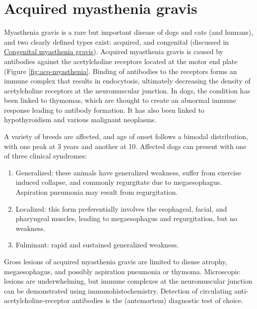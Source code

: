\documentclass[openany]{book}
\providecommand{\tightlist}{%
  \setlength{\itemsep}{0pt}\setlength{\parskip}{0pt}}
\begin{document}
\hypertarget{acquired-myasthenia-gravis}{\section{Acquired myasthenia
gravis}\label{acquired-myasthenia-gravis}}

Myasthenia gravis is a rare but important disease of dogs and cats (and
humans), and two clearly defined types exist: acquired, and congenital
(discussed in
\protect\hyperlink{congenital-myasthenia-gravis}{Congenital myasthenia
gravis}). Acquired myasthenia gravis is caused by antibodies against the
acetylcholine receptors located at the motor end plate (Figure
\ref{fig:acq-myasthenia}. Binding of antibodies to the receptors forms
an immune complex that results in endocytosis, ultimately decreasing the
density of acetylcholine receptors at the neuromuscular junction. In
dogs, the condition has been linked to thymomas, which are thought to
create an abnormal immune response leading to antibody formation. It has
also been linked to hypothyroidism and various malignant neoplasms.

A variety of breeds are affected, and age of onset follows a bimodal
distribution, with one peak at 3 years and another at 10. Affected dogs
can present with one of three clinical syndromes:

\begin{enumerate}
\def\labelenumi{\arabic{enumi}.}
\tightlist
\item
  Generalized: these animals have generalized weakness, suffer from
  exercise induced collapse, and commonly regurgitate due to
  megaesophagus. Aspiration pneumonia may result from regurgitation.
\item
  Localized: this form preferentially involves the esophageal, facial,
  and pharyngeal muscles, leading to megaesophagus and regurgitation,
  but no weakness.
\item
  Fulminant: rapid and sustained generalized weakness.
\end{enumerate}

Gross lesions of acquired myasthenia gravis are limited to disuse
atrophy, megaesophagus, and possibly aspiration pneumonia or thymoma.
Microscopic lesions are underwhelming, but immune complexes at the
neuromuscular junction can be demonstrated using immunohistochemistry.
Detection of circulating anti-acetylcholine-receptor antibodies is the
(antemortem) diagnostic test of choice.
\end{document}
